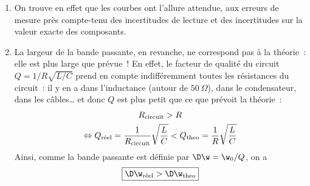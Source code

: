 \documentclass[a4paper, 11pt, final, garamond]{book}
\begin{document}
\begin{enumerate}[label=\sqenumi, start=5]
    \item On trouve en effet que les courbes ont l'allure attendue, aux erreurs
        de mesure près compte-tenu des incertitudes de lecture et des
        incertitudes sur la valeur exacte des composants.
    \item La largeur de la bande passante, en revanche, ne correspond pas à la
        théorie~: elle est plus large que prévue~! En effet, le facteur de
        qualité du circuit $Q = 1/R\sqrt{L/C}$ prend en compte indifféremment
        toutes les résistances du circuit~: il y en a dans l'inductance (autour
        de $\SI{50}{\Omega}$), dans le condensateur, dans les câbles… et donc $Q$
        est plus petit que ce que prévoit la théorie~:
        \begin{gather*}
            R_{\rm circuit} > R\\
            \Leftrightarrow
            Q_{\text{réel}} = \frac{1}{R_{\rm circuit}} \sqrt{\frac{L}{C}}
            <
            Q_{\rm theo} = \frac{1}{R} \sqrt{\frac{L}{C}}
        \end{gather*}
            Ainsi, comme la bande passante est définie par $\D\w = \w_0/Q$, on a
            \[\boxed{\D\w_{\text{réel}} > \D\w_{\rm theo}}\]
\end{enumerate}
\end{document}
